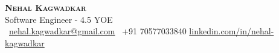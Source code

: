 
\begin{center}
    \textbf{\LARGE \scshape Nehal Kagwadkar} \\ \vspace{0.5mm}
    \small Software Engineer - 4.5 YOE \\ \vspace{0.5mm}
     \ \href{mailto:nehal.kagwadkar@gmail.com}{nehal.kagwadkar@gmail.com} \quad
     \ \small +91 70577033840 \quad
    \href{https://linkedin.com/in/nehal-kagwadkar}{ linkedin.com/in/nehal-kagwadkar}
\end{center}
